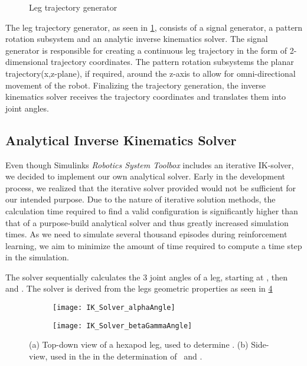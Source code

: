\begin{figure}
	\centerline{}
	\caption{Leg trajectory generator}
	\label{figure: Leg trajectory generator}
\end{figure}

The leg trajectory generator, as seen in \ref{figure: Leg trajectory generator}, consists of a signal generator, a pattern rotation subsystem and an analytic inverse kinematics solver.
The signal generator is responsible for creating a continuous leg trajectory in the form of 2-dimensional trajectory coordinates.
The pattern rotation subsystems the planar trajectory(x,z-plane), if required, around the z-axis to allow for omni-directional movement of the robot.
Finalizing the trajectory generation, the inverse kinematics solver receives the trajectory coordinates and translates them into joint angles.


\subsection{Analytical Inverse Kinematics Solver}
Even though Simulinks \textit{Robotics System Toolbox} includes an iterative IK-solver, we decided to implement our own analytical solver.
Early in the development process, we realized that the iterative solver provided would not be sufficient for our intended purpose.
Due to the nature of iterative solution methods, the calculation time required to find a valid configuration is significantly higher than that of a purpose-build analytical solver and thus greatly increased simulation times.
As we need to simulate several thousand episodes during reinforcement learning, we aim to minimize the 
amount of time required to compute a time step in the simulation.

The solver sequentially calculates the 3 joint angles of a leg, starting at \textalpha, then \textbeta and \textgamma.
The solver is derived from the legs geometric properties as seen in \ref{figure: IK angle derivations}

\begin{figure}[h]
	\begin{subfigure}{.5\textwidth} %
		\centering
		\texttt{[image: IK\_Solver\_alphaAngle]}  %
		\caption{}
		\label{figure: IK Solver Alpha Angle}
	\end{subfigure}
	\begin{subfigure}{.5\textwidth}
		\centering
		\texttt{[image: IK\_Solver\_betaGammaAngle]}  
		\caption{}
		\label{figure: IK Solver Beta/Gamma Angle}
	\end{subfigure}
	\caption[Angle derivation drawings]{(a) Top-down view of a hexapod leg, used to determine \textalpha. (b) Side-view, used in the in the determination of \textbeta \ and \textgamma.}
	\label{figure: IK angle derivations}
\end{figure}


